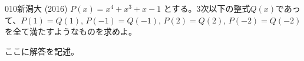 \begin{prob}{010}{}{新潟大 (2016)}
 $P(x)=x^4+x^3+x-1$ とする。3次以下の整式$Q(x)$であって、$P(1)=Q(1)$, $P(-1)=Q(-1)$, $P(2)=Q(2)$, $P(-2)=Q(-2)$ を全て満たすようなものを求めよ。
\end{prob}
ここに解答を記述。